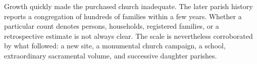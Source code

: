 Growth quickly made the purchased church inadequate. The later parish history reports a congregation of hundreds of families within a few years. Whether a particular count denotes persons, households, registered families, or a retrospective estimate is not always clear. The scale is nevertheless corroborated by what followed: a new site, a monumental church campaign, a school, extraordinary sacramental volume, and successive daughter parishes.

